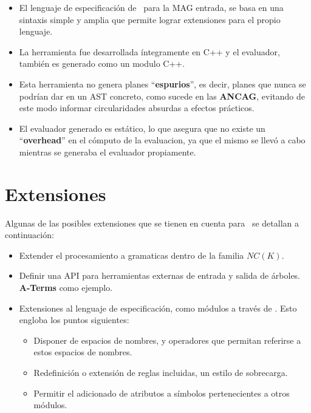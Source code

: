 \begin{itemize}
\item El lenguaje de especificación de \maggen\ para la MAG entrada, se basa en una sintaxis simple y amplia que permite lograr extensiones para el propio lenguaje.

\item La herramienta fue desarrollada íntegramente en C++ y el evaluador, también es generado como un modulo C++. 

\item Esta herramienta no genera planes ``\textbf{espurios}'', es decir, planes que nunca se podrían dar en un AST concreto, como sucede en las \textbf{ANCAG}, evitando de este modo informar circularidades absurdas a efectos prácticos.

\item El evaluador generado es estático, lo que asegura que no existe un ``\textbf{overhead}'' en el cómputo de la evaluacion, ya que el mismo se llevó a cabo mientras se generaba el evaluador propiamente.
\end{itemize}

\section{Extensiones}
Algunas de las posibles extensiones que se tienen en cuenta para \maggen\ se detallan a continuación:
\begin{itemize}
\item Extender el procesamiento a gramaticas dentro de la familia $NC(K)$.

\item Definir una API para herramientas externas de entrada y salida de árboles. \textbf{A-Terms} como ejemplo.

\item Extensiones al lenguaje de especificación, como módulos a través de . Esto engloba los puntos siguientes:

\begin{itemize}
\item Disponer de espacios de nombres, y operadores que permitan referirse a estos espacios de nombres.

\item Redefinición o extensión de reglas incluidas, un estilo de sobrecarga.

\item Permitir el adicionado de atributos a símbolos pertenecientes a otros módulos.
\end{itemize}

\end{itemize}

